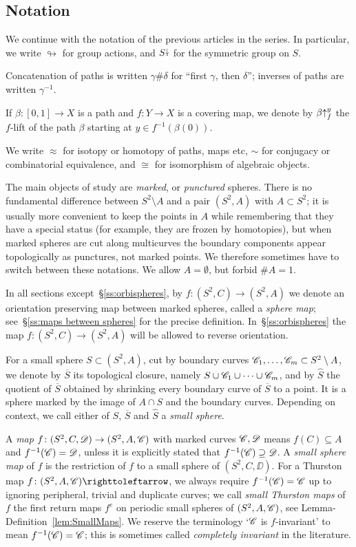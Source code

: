 \documentclass{amsart}
\begin{document}
\subsection{Notation}
We continue with the notation of the previous articles in the
series. In particular, we write $\looparrowright$ for group actions,
and $S{\stackrel{\downarrow}{\smash.}}$ for the symmetric group on $S$.

Concatenation of paths is written $\gamma\#\delta$ for ``first
$\gamma$, then $\delta$''; inverses of paths are written
$\gamma^{-1}$.

If $\beta\colon[0,1]\to X$ is a path and $f\colon Y\to X$ is a
covering map, we denote by $\beta{\uparrow}_{f}^{y}$ the $f$-lift of the
path $\beta$ starting at $y\in f^{-1}(\beta(0))$.

We write $\approx$ for isotopy or homotopy of paths, maps etc, $\sim$
for conjugacy or combinatorial equivalence, and $\cong$ for
isomorphism of algebraic objects.  

The main objects of study are \emph{marked}, or \emph{punctured}
spheres. There is no fundamental difference between $S^2\setminus A$
and a pair $(S^2,A)$ with $A\subset S^2$; it is usually more
convenient to keep the points in $A$ while remembering that they have
a special status (for example, they are frozen by homotopies), but
when marked spheres are cut along multicurves the boundary components
appear topologically as punctures, not marked points. We therefore
sometimes have to switch between these notations. We allow
$A=\emptyset$, but forbid $\#A=1$.

In all sections except~\S\ref{ss:orbispheres}, by
$f\colon(S^2,C)\to(S^2,A)$ we denote an orientation preserving map
between marked spheres, called a \emph{sphere map}; see~\S\ref{ss:maps
  between spheres} for the precise
definition. In~\S\ref{ss:orbispheres} the map
$f\colon(S^2,C)\to(S^2,A)$ will be allowed to reverse orientation.

For a small sphere $S\subset(S^2,A)$, cut by boundary curves
${\mathscr C}_1,\dots,{\mathscr C}_m\subset S^2\setminus A$, we denote by $\overline S$
its topological closure, namely $S\cup{\mathscr C}_1\cup\cdots\cup{\mathscr C}_m$, and
by $\widehat S$ the quotient of $\overline S$ obtained by shrinking
every boundary curve of $\overline S$ to a point. It is a sphere
marked by the image of $A\cap S$ and the boundary curves. Depending on
context, we call either of $S$, $\overline S$ and $\widehat S$ a
\emph{small sphere}.

A \emph{map} $f\colon (S^2,C,{\mathscr D})\to(S^2,A,{\mathscr C})$ with marked curves
${\mathscr C},{\mathscr D}$ means $f(C)\subseteq A$ and $f^{-1}({\mathscr C})={\mathscr D}$, unless it is
explicitly stated that $f^{-1}({\mathscr C})\supseteq{\mathscr D}$. A \emph{small sphere
  map} of $f$ is the restriction of $f$ to a small sphere of
$(S^2,C,\DD)$. For a Thurston map $f\colon(S^2,A,\CC)\selfmap$, we
always require $f^{-1}({\mathscr C})={\mathscr C}$ up to ignoring peripheral, trivial
and duplicate curves; we call \emph{small Thurston maps} of $f$ the
first return maps $f^e$ on periodic small spheres of $(S^2,A,{\mathscr C})$,
see Lemma-Definition~\ref{lem:SmallMaps}. We reserve the terminology
`${\mathscr C}$ is $f$-invariant' to mean $f^{-1}({\mathscr C})={\mathscr C}$; this is sometimes
called \emph{completely invariant} in the literature.
\end{document}
